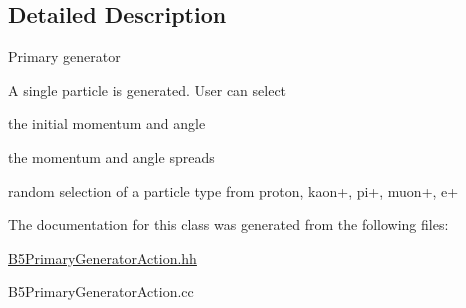 \subsection{Detailed Description}
Primary generator

A single particle is generated. User can select
\begin{DoxyItemize}
\item the initial momentum and angle
\item the momentum and angle spreads
\item random selection of a particle type from proton, kaon+, pi+, muon+, e+ 
\end{DoxyItemize}

The documentation for this class was generated from the following files\+:\begin{DoxyCompactItemize}
\item 
\hyperlink{_b5_primary_generator_action_8hh}{B5\+Primary\+Generator\+Action.\+hh}\item 
B5\+Primary\+Generator\+Action.\+cc\end{DoxyCompactItemize}
